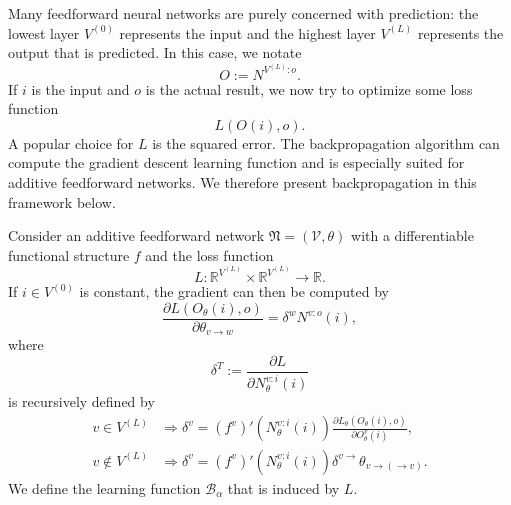 \documentclass[a4paper,11pt]{report}
\begin{document}
\begin{Par}
Many feedforward neural networks are purely concerned with prediction: the lowest layer $V^{(0)}$ represents the input and the highest layer $V^{(L)}$ represents the output that is predicted. In this case, we notate
\begin{equation}
O:=N^{V^{(L)}:o}.
\end{equation}
If $i$ is the input and $o$ is the actual result, we now try to optimize some loss function
\[
L\left(O(i),o\right).
\]
A popular choice for $L$ is the squared error. The backpropagation algorithm can compute the gradient descent learning function and is especially suited for additive feedforward networks. We therefore present backpropagation in this framework below.
\end{Par}

\begin{The}[Backpropagation]\label{the:backpropagation}
Consider an additive feedforward network $\mathfrak{N}=(\mathcal{V},\theta)$ with a differentiable functional structure $f$ and the loss function 
\begin{equation}
L:\mathbb{R}^{V^{(L)}}\times \mathbb{R}^{V^{(L)}}\to\mathbb{R}.
\end{equation}
If $i\in V^{(0)}$ is constant, the gradient can then be computed by
\begin{equation}\label{eq:backprop-1}
\frac{\partial L(O_{\theta}(i),o)}{\partial\theta_{v\to w}}=\delta^wN^{v:o}(i),
\end{equation}
where
\[
\delta^T:=\frac{\partial L}{\partial N^{v:i}_{\theta}(i)}
\]
is recursively defined by
\begin{equation}\label{eq:backprop-2}
\begin{aligned}
v\in V^{(L)}&\Rightarrow\delta^v=\left(f^v\right)'\left(N^{v:i}_{\theta}(i)\right)\frac{\partial L_{\theta}(O_{\theta}(i),o)}{\partial O_{\theta}^v(i)},\\
v\notin V^{(L)}&\Rightarrow\delta^v=\left(f^v\right)'\left(N^{v:i}_{\theta}(i)\right)\delta^{v\to}\theta_{v\to(\to v)}.
\end{aligned}
\end{equation}
We define the learning function $\mathcal{B}_{\alpha}$ that is induced by $L$.
\end{The}
\end{document}

